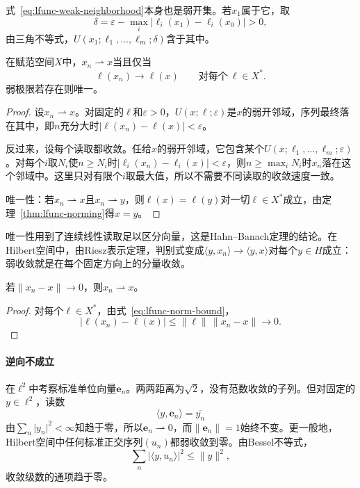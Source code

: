 式~\eqref{eq:lfunc-weak-neighborhood}本身也是弱开集。若$x_1$属于它，取
\[
\delta=\varepsilon-\max_i\lvert\ell_i(x_1)-\ell_i(x_0)\rvert>0 ,
\]
由三角不等式，$U(x_1;\ell_1,\ldots,\ell_m;\delta)$含于其中。

\begin{theorem}[弱收敛的读取判别]
\label{thm:lfunc-weak-criterion}
在赋范空间$X$中，$x_n\rightharpoonup x$当且仅当
\begin{equation}
\ell(x_n)\to\ell(x)\qquad\text{对每个}\ \ell\in X^* .
\label{eq:lfunc-weak-criterion}
\end{equation}
弱极限若存在则唯一。
\end{theorem}

\begin{proof}
设$x_n\rightharpoonup x$。对固定的$\ell$和$\varepsilon>0$，$U(x;\ell;\varepsilon)$是$x$的弱开邻域，序列最终落在其中，即$n$充分大时$\lvert\ell(x_n)-\ell(x)\rvert<\varepsilon$。

反过来，设每个读取都收敛。任给$x$的弱开邻域，它包含某个$U(x;\ell_1,\ldots,\ell_m;\varepsilon)$。对每个$i$取$N_i$使$n\geq N_i$时$\lvert\ell_i(x_n)-\ell_i(x)\rvert<\varepsilon$，则$n\geq\max_iN_i$时$x_n$落在这个邻域中。这里只对有限个$i$取最大值，所以不需要不同读取的收敛速度一致。

唯一性：若$x_n\rightharpoonup x$且$x_n\rightharpoonup y$，则$\ell(x)=\ell(y)$对一切$\ell\in X^*$成立，由定理~\ref{thm:lfunc-norming}得$x=y$。
\end{proof}

唯一性用到了连续线性读取足以区分向量，这是Hahn--Banach定理的结论。在Hilbert空间中，由Riesz表示定理，判别式变成$\langle y,x_n\rangle\to\langle y,x\rangle$对每个$y\in H$成立：弱收敛就是在每个固定方向上的分量收敛。

\begin{theorem}[范数收敛推出弱收敛]
\label{thm:lfunc-strong-implies-weak}
若$\lVert x_n-x\rVert\to0$，则$x_n\rightharpoonup x$。
\end{theorem}

\begin{proof}
对每个$\ell\in X^*$，由式~\eqref{eq:lfunc-norm-bound}，
\[
\lvert\ell(x_n)-\ell(x)\rvert\leq\lVert\ell\rVert\,\lVert x_n-x\rVert\to0 .
\]
\end{proof}

\paragraph{逆向不成立}
在$\ell^2$中考察标准单位向量$\bm e_n$。两两距离为$\sqrt2$，没有范数收敛的子列。但对固定的$y\in\ell^2$，读数
\[
\langle y,\bm e_n\rangle=\overline{y_n}
\]
由$\sum_n\lvert y_n\rvert^2<\infty$知趋于零，所以$\bm e_n\rightharpoonup0$，而$\lVert\bm e_n\rVert=1$始终不变。更一般地，Hilbert空间中任何标准正交序列$(u_n)$都弱收敛到零。由Bessel不等式，
\[
\sum_n\lvert\langle y,u_n\rangle\rvert^2\leq\lVert y\rVert^2 ,
\]
收敛级数的通项趋于零。

